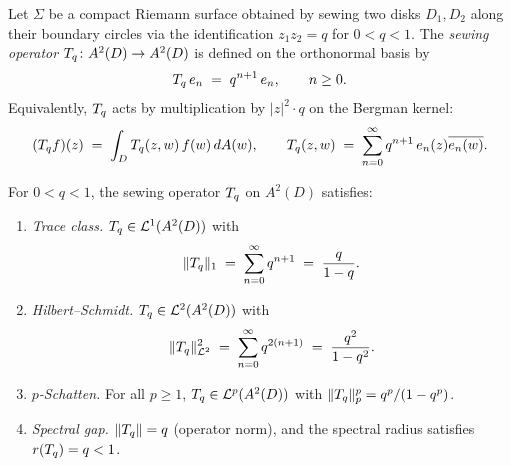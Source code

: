 \begin{definition}%
\label{def:thqg-X-sewing-operator}%
%
%
Let $\Sigma$ be a compact Riemann surface obtained by sewing
two disks $D_1, D_2$ along their boundary circles via the
identification $z_1 z_2 = q$ for $0 < q < 1$. The
\emph{sewing operator} $T_q \colon A^2(D) \to A^2(D)$ is
defined on the orthonormal basis by
\begin{equation}\label{eq:thqg-X-sewing-eigenvalues}
T_q\, e_n \;=\; q^{n+1}\, e_n,
\qquad n \geq 0.
\end{equation}
Equivalently, $T_q$ acts by multiplication by
$|z|^2 \cdot q$ on the Bergman kernel:
\begin{equation}\label{eq:thqg-X-sewing-kernel}
(T_q f)(z)
\;=\;
\int_D T_q(z,w)\,f(w)\,dA(w),
\qquad
T_q(z,w)
\;=\;
\sum_{n=0}^{\infty}
q^{n+1}\,e_n(z)\overline{e_n(w)}.
\end{equation}
\end{definition}

\begin{lemma}%
\label{lem:thqg-X-sewing-schatten}%
%
For $0 < q < 1$, the sewing operator $T_q$ on $A^2(D)$
satisfies:
\begin{enumerate}[label=\textup{(\roman*)}]
\item \emph{Trace class.}
 $T_q \in \mathcal{L}^1(A^2(D))$ with
 \begin{equation}\label{eq:thqg-X-trace-norm}
 \|T_q\|_1
 \;=\;
 \sum_{n=0}^{\infty} q^{n+1}
 \;=\;
 \frac{q}{1-q}.
 \end{equation}
\item \emph{Hilbert--Schmidt.}
 $T_q \in \mathcal{L}^2(A^2(D))$ with
 \begin{equation}\label{eq:thqg-X-hs-norm}
 \|T_q\|_{\mathcal{L}^2}^2
 \;=\;
 \sum_{n=0}^{\infty} q^{2(n+1)}
 \;=\;
 \frac{q^2}{1-q^2}.
 \end{equation}
\item \emph{$p$-Schatten.}
 For all $p \geq 1$,
 $T_q \in \mathcal{L}^p(A^2(D))$ with
 $\|T_q\|_p^p = q^p/(1-q^p)$.
\item \emph{Spectral gap.}
 $\|T_q\| = q$ (operator norm), and the spectral
 radius satisfies $r(T_q) = q < 1$.
\end{enumerate}
\end{lemma}

